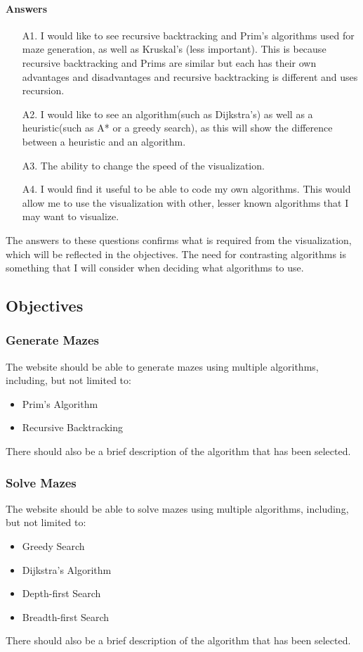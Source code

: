 \documentclass[titlepage]{article}
\begin{document}
\paragraph*{Answers}
\begin{enumerate}
    \item[A1.]I would like to see recursive backtracking and Prim's algorithms used for maze generation, as well as Kruskal's (less important). This is because recursive backtracking and Prims are similar but each has their own advantages and disadvantages and recursive backtracking is different and uses recursion.
    \item[A2.]I would like to see an algorithm(such as Dijkstra's) as well as a heuristic(such as A* or a greedy search), as this will show the difference between a heuristic and an algorithm.
    \item[A3.]The ability to change the speed of the visualization.
    \item[A4.]I would find it useful to be able to code my own algorithms. This would allow me to use the visualization with other, lesser known algorithms that I may want to visualize.
\end{enumerate}
The answers to these questions confirms what is required from the visualization, which will be reflected in the objectives. The need for contrasting algorithms is something that I will consider when deciding what algorithms to use.
\subsection{Objectives}
\subsubsection{Generate Mazes}
The website should be able to generate mazes using multiple algorithms, including, but not limited to:
\begin{itemize}
    \item Prim's Algorithm
    \item Recursive Backtracking
\end{itemize}
There should also be a brief description of the algorithm that has been selected.

\subsubsection{Solve Mazes}
The website should be able to solve mazes using multiple algorithms, including, but not limited to:
\begin{itemize}
    \item Greedy Search
    \item Dijkstra's Algorithm
    \item Depth-first Search
    \item Breadth-first Search
\end{itemize}
There should also be a brief description of the algorithm that has been selected.
\end{document}
